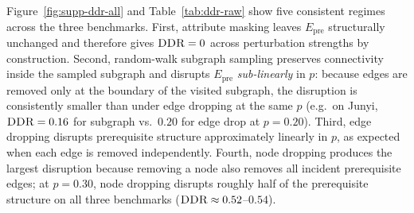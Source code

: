 \documentclass[pdflatex,sn-mathphys-num]{sn-jnl}
\newcommand{\Epre}{\ensuremath{E_{\text{pre}}}}
\newcommand{\DDR}{\textsc{DDR}}
\begin{document}

Figure~\ref{fig:supp-ddr-all} and Table~\ref{tab:ddr-raw} show five
consistent regimes across the three benchmarks. First, attribute
masking leaves $\Epre$ structurally unchanged and therefore gives
$\DDR{}=0$ across perturbation strengths by construction. Second,
random-walk subgraph sampling preserves connectivity inside the
sampled subgraph and disrupts $\Epre$ \emph{sub-linearly} in $p$:
because edges are removed only at the boundary of the visited
subgraph, the disruption is consistently smaller than under
edge dropping at the same $p$ (e.g.\ on Junyi, $\DDR{} = 0.16$ for
subgraph vs.\ $0.20$ for edge drop at $p=0.20$). Third, edge dropping
disrupts prerequisite structure approximately linearly in $p$, as
expected when each edge is removed independently. Fourth, node
dropping produces the largest disruption because removing a node also
removes all incident prerequisite edges; at $p = 0.30$, node dropping
disrupts roughly half of the prerequisite structure on all three
benchmarks ($\DDR{} \approx 0.52$--$0.54$).
\end{document}
